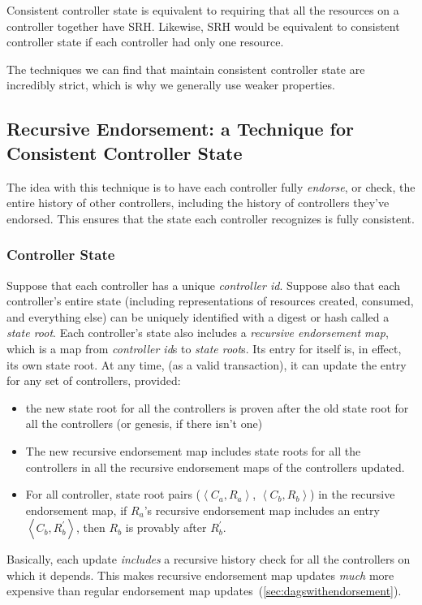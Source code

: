 \documentclass[a4paper,USenglish,cleveref, autoref, thm-restate, anonymous]{lipics-v2021}
\begin{document}
Consistent controller state is equivalent to requiring that all the resources on a controller together have SRH.
Likewise, SRH would be equivalent to consistent controller state if each controller had only one resource.

The techniques we can find that maintain consistent controller state are incredibly strict, which is why we generally use weaker properties.

\subsection{Recursive Endorsement: a Technique for Consistent Controller State}
The idea with this technique is to have each controller fully \textit{endorse}, or check, the entire history of other controllers, including the history of controllers they've endorsed.
This ensures that the state each controller recognizes is fully consistent.

\subsubsection{Controller State}
Suppose that each controller has a unique \textit{controller id}.
Suppose also that each controller's entire state (including representations of resources created, consumed, and everything else) can be uniquely identified with a digest or hash called a \textit{state root}.
Each controller's state also includes a \textit{recursive endorsement map}, which is a map from \textit{controller id}s to \textit{state root}s.
Its entry for itself is, in effect, its own state root.
At any time, (as a valid transaction), it can update the entry for any set of controllers, provided:
\begin{itemize}
    \item the new state root for all the controllers is proven after the old state root for all the controllers (or genesis, if there isn't one)
    \item The new recursive endorsement map includes state roots for all the controllers in all the recursive endorsement maps of the controllers updated.
    \item For all controller, state root pairs ($\left\langle C_a, R_a\right\rangle$, $\left\langle C_b, R_b\right\rangle$) in the recursive endorsement map, if $R_a$'s recursive endorsement map includes an entry $\left\langle C_b, R_b^\prime\right\rangle$, then $R_b$ is provably after $R_b^\prime$.
\end{itemize}
Basically, each update \textit{includes} a recursive history check for all the controllers on which it depends.
This makes recursive endorsement map updates \emph{much} more expensive than regular endorsement map updates~(\cref{sec:dagswithendorsement}).
\end{document}
